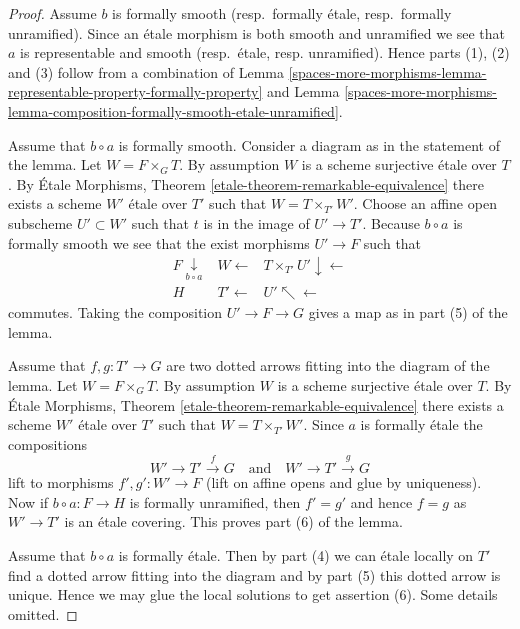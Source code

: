 \begin{proof}
Assume $b$ is formally smooth (resp.\ formally \'etale,
resp.\ formally unramified). Since an \'etale morphism is both
smooth and unramified we see that $a$ is representable and smooth
(resp.\ \'etale, resp. unramified). Hence parts (1), (2) and (3)
follow from a combination of
Lemma \ref{spaces-more-morphisms-lemma-representable-property-formally-property}
and
Lemma \ref{spaces-more-morphisms-lemma-composition-formally-smooth-etale-unramified}.

\medskip\noindent
Assume that $b \circ a$ is formally smooth. Consider a diagram
as in the statement of the lemma. Let $W = F \times_G T$.
By assumption $W$ is a scheme surjective \'etale over $T$. By
\'Etale Morphisms, Theorem \ref{etale-theorem-remarkable-equivalence}
there exists a scheme $W'$ \'etale over $T'$ such that $W = T \times_{T'} W'$.
Choose an affine open subscheme $U' \subset W'$ such that $t$ is in
the image of $U' \to T'$. Because $b \circ a$ is formally
smooth we see that the exist morphisms $U' \to F$ such that
$$
\begin{array}{ccc}F \underset{b \circ a}{\downarrow} & W \longleftarrow & T \times_{T'} U' \downarrow\longleftarrow \\ H & T' \longleftarrow & U' \nwarrow\longleftarrow\end{array}
$$
commutes. Taking the composition $U' \to F \to G$ gives a
map as in part (5) of the lemma.

\medskip\noindent
Assume that $f, g : T' \to G$ are two dotted arrows fitting into the
diagram of the lemma. Let $W = F \times_G T$.
By assumption $W$ is a scheme surjective \'etale over $T$. By
\'Etale Morphisms, Theorem \ref{etale-theorem-remarkable-equivalence}
there exists a scheme $W'$ \'etale over $T'$ such that $W = T \times_{T'} W'$.
Since $a$ is formally \'etale the compositions
$$
W' \to T' \xrightarrow{f} G
\quad\text{and}\quad
W' \to T' \xrightarrow{g} G
$$
lift to morphisms $f', g' : W' \to F$ (lift on affine opens and glue by
uniqueness). Now if $b \circ a : F \to H$ is formally unramified, then
$f' = g'$ and hence $f = g$ as $W' \to T'$ is an \'etale covering. This proves
part (6) of the lemma.

\medskip\noindent
Assume that $b \circ a$ is formally \'etale. Then by part (4) we
can \'etale locally on $T'$ find a dotted arrow fitting into the diagram
and by part (5) this dotted arrow is unique. Hence we may glue the
local solutions to get assertion (6). Some details omitted.
\end{proof}

